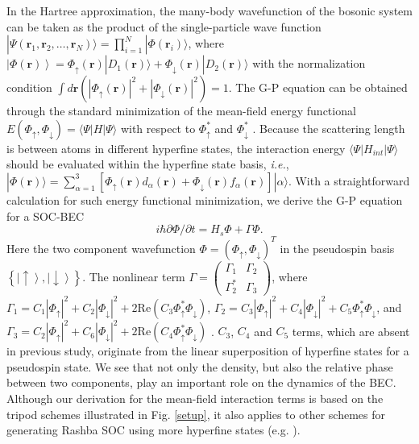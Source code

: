 \documentclass[prl,twocolumn,showpacs,floatfix]{revtex4}
\begin{document}
In the Hartree approximation, the many-body wavefunction of the bosonic
system can be taken as the product of the single-particle wave function $%
|\Psi (\mathbf{r}_{1},\mathbf{r}_{2},\ldots ,\mathbf{r}_{N})\rangle
=\prod_{i=1}^{N}|\Phi (\mathbf{r}_{i})\rangle $, where $\left\vert \Phi (%
\mathbf{r})\right\rangle =\Phi _{\uparrow }(\mathbf{r})|D_{1}(\mathbf{r}%
)\rangle +\Phi _{\downarrow }(\mathbf{r})|D_{2}(\mathbf{r})\rangle $ with
the normalization condition $\int d\mathbf{r}(|\Phi _{\uparrow }(\mathbf{r}%
)|^{2}+|\Phi _{\downarrow }(\mathbf{r})|^{2})=1$. The G-P equation can be
obtained through the standard minimization of the mean-field energy
functional $E(\Phi _{\uparrow },\Phi _{\downarrow })=\langle \Psi |H|\Psi
\rangle $ with respect to $\Phi _{\uparrow }^{\ast }$ and $\Phi _{\downarrow
}^{\ast }$ \cite{Pethick}. Because the scattering length is between atoms in
different hyperfine states, the interaction energy $\langle \Psi
|H_{int}|\Psi \rangle $ should be evaluated within the hyperfine state
basis, \textit{i.e.}, $|\Phi (\mathbf{r})\rangle =\sum_{\alpha =1}^{3}[\Phi
_{\uparrow }(\mathbf{r})d_{\alpha }(\mathbf{r})+\Phi _{\downarrow }(\mathbf{r%
})f_{\alpha }(\mathbf{r})]|\alpha \rangle $. With a straightforward
calculation for such energy functional minimization, we derive the G-P
equation for a SOC-BEC
\begin{equation}
i\hbar \partial \Phi /\partial t=H_{s}\Phi +\Gamma \Phi .  \label{nonlinear1}
\end{equation}%
Here the two component wavefunction $\Phi =(\Phi _{\uparrow },\Phi
_{\downarrow })^{T}$ in the pseudospin basis $\left\{ \left\vert \uparrow
\right\rangle ,\left\vert \downarrow \right\rangle \right\} $. The nonlinear
term $\Gamma =%
\begin{pmatrix}
\Gamma _{1} & \Gamma _{2} \\
\Gamma _{2}^{\ast } & \Gamma _{3}%
\end{pmatrix}%
$, where $\Gamma _{1}=C_{1}|\Phi _{\uparrow }|^{2}+C_{2}|\Phi _{\downarrow
}|^{2}+2\text{Re}(C_{3}\Phi _{\uparrow }^{\ast }\Phi _{\downarrow })$, $%
\Gamma _{2}=C_{3}|\Phi _{\uparrow }|^{2}+C_{4}|\Phi _{\downarrow
}|^{2}+C_{5}\Phi _{\uparrow }^{\ast }\Phi _{\downarrow }$, and $\Gamma
_{3}=C_{2}|\Phi _{\uparrow }|^{2}+C_{6}|\Phi _{\downarrow }|^{2}+2\text{Re}%
(C_{4}\Phi _{\uparrow }^{\ast }\Phi _{\downarrow })$ \cite{coe}. $C_{3}$, $%
C_{4}$ and $C_{5}$ terms, which are absent in previous study, originate from
the linear superposition of hyperfine states for a pseudospin state. We see
that not only the density, but also the relative phase between two
components, play an important role on the dynamics of the BEC. Although our
derivation for the mean-field interaction terms is based on the tripod
schemes illustrated in Fig. \ref{setup}, it also applies to other schemes
for generating Rashba SOC using more hyperfine states (e.g. \cite{Ian3}).
\end{document}
